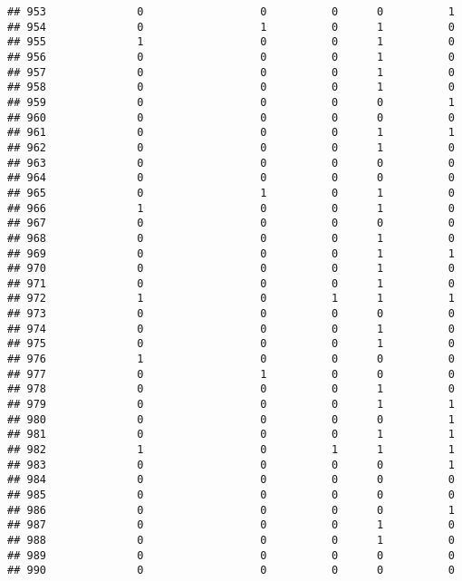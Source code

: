 \documentclass[
]{article}
\begin{document}
\begin{verbatim}
## 953              0                  0          0      0          1
## 954              0                  1          0      1          0
## 955              1                  0          0      1          0
## 956              0                  0          0      1          0
## 957              0                  0          0      1          0
## 958              0                  0          0      1          0
## 959              0                  0          0      0          1
## 960              0                  0          0      0          0
## 961              0                  0          0      1          1
## 962              0                  0          0      1          0
## 963              0                  0          0      0          0
## 964              0                  0          0      0          0
## 965              0                  1          0      1          0
## 966              1                  0          0      1          0
## 967              0                  0          0      0          0
## 968              0                  0          0      1          0
## 969              0                  0          0      1          1
## 970              0                  0          0      1          0
## 971              0                  0          0      1          0
## 972              1                  0          1      1          1
## 973              0                  0          0      0          0
## 974              0                  0          0      1          0
## 975              0                  0          0      1          0
## 976              1                  0          0      0          0
## 977              0                  1          0      0          0
## 978              0                  0          0      1          0
## 979              0                  0          0      1          1
## 980              0                  0          0      0          1
## 981              0                  0          0      1          1
## 982              1                  0          1      1          1
## 983              0                  0          0      0          1
## 984              0                  0          0      0          0
## 985              0                  0          0      0          0
## 986              0                  0          0      0          1
## 987              0                  0          0      1          0
## 988              0                  0          0      1          0
## 989              0                  0          0      0          0
## 990              0                  0          0      0          0

\end{verbatim}
\end{document}
